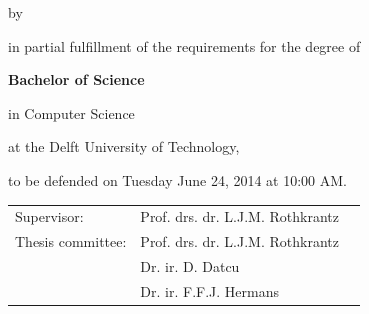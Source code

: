 \begin{titlepage}

\begin{center}


\vspace*{2\bigskipamount}

{\makeatletter
\titlestyle\color{tudelft-cyan}\Huge\@title
\makeatother}

{\makeatletter
\ifx\@subtitle\undefined\else
    \bigskip
    \titlefont\titleshape\LARGE\@subtitle
\fi
\makeatother}

\bigskip
\bigskip

by

\bigskip
\bigskip

{\makeatletter
\titlefont\Large\bfseries\@author
\makeatother}

\vfill

in partial fulfillment of the requirements for the degree of

\bigskip
\bigskip

{\bfseries Bachelor of Science}

in Computer Science

\bigskip
\bigskip

at the Delft University of Technology,

to be defended on Tuesday June 24, 2014 at 10:00 AM.

\vfill

\begin{tabular}{lll}
    Supervisor: & Prof. drs. dr. L.J.M. Rothkrantz\\
    Thesis committee:
        & Prof. drs. dr. L.J.M. Rothkrantz \\
        & Dr. ir. D. Datcu\\
        & Dr. ir. F.F.J. Hermans
\end{tabular}


\end{center}
\end{titlepage}
